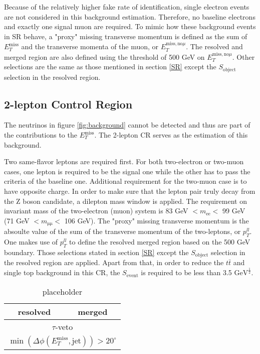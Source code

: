 \documentclass[class=NCU_thesis, crop=false]{standalone}
\begin{document}
		Because of the relatively higher fake rate of identification, single electron events are not considered in this background estimation. Therefore, no baseline electrons and exactly one signal muon are required. To mimic how these background events in SR behave, a "proxy" missing transverse momentum is defined as the sum of $E_T^{\mathrm{miss}}$ and the transverse momenta of the muon, or $E_T^{\mathrm{miss, no } \mu}$. The resolved and merged region are also defined using the threshold of 500 GeV on $E_T^{\mathrm{miss, no } \mu}$. Other selections are the same as those mentioned in section \ref{SR} except the $S_{\mathrm{object}}$ selection in the resolved region.
	
	\subsection{2-lepton Control Region}
		The neutrinos in figure \ref{fig:background}  cannot be detected and thus are part of the contributions to the $E_T^{\mathrm{miss}}$. The 2-lepton CR serves as the estimation of this background.
		
		Two same-flavor leptons are required first. For both two-electron or two-muon cases, one lepton is required to be the signal one while the other has to pass the criteria of the baseline one. Additional requirement for the two-muon case is to have opposite charge. In order to make sure that the lepton pair truly decay from the Z boson candidate, a dilepton mass window is applied. The requirement on invariant mass of the two-electron (muon) system is 83 GeV $< m_{\mathrm{ee}} <$ 99 GeV (71 GeV $< m_{\mathrm{\mu \mu}} <$ 106 GeV). The "proxy" missing transverse momentum is the absoulte value of the sum of the transverse momentum of the two-leptons, or $p_T^{ll}$. One makes use of $p_T^{ll}$ to define the resolved merged region based on the 500 GeV boundary. Those selections stated in section \ref{SR} except the $S_{\mathrm{object}}$ selection in the resolved region are applied. Apart from that, in order to reduce the $t\bar{t}$ and single top background in this CR, the $S_{\mathrm{event}}$ is required to be less than 3.5 $\mathrm{GeV}^\frac{1}{2}$.
		
		\begin{table}[h]
			\caption{placeholder}
			\label{tab:resolved vs merged}
			\begin{tabular}{|c|c|}
				\hline
				resolved & merged\\
				\hline
				\multicolumn{2}{|c|}{$\tau$-veto}\\
				\hline
				\multicolumn{2}{|c|}{$\min (\Delta \phi(E_T^{\mathrm{miss}}, \mathrm{jet})) > 20^\circ$}\\
				\hline
			\end{tabular}
		\end{table}
\end{document}
